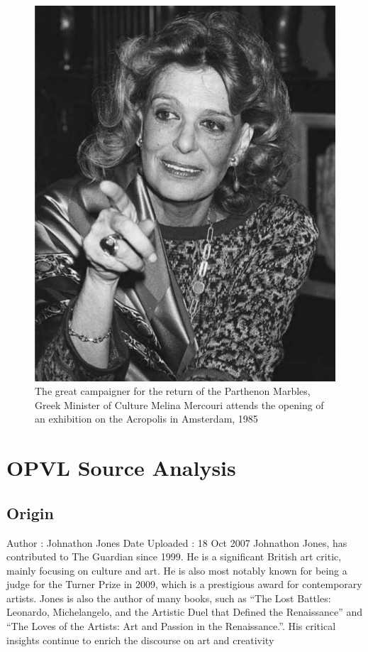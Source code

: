 \documentclass[12pt, letterpaper]{article}
\begin{document}
\begin{figure}
    \centering
    \includegraphics{Melina.png}
    \caption{The great campaigner for the return of the Parthenon Marbles, Greek Minister of Culture Melina Mercouri attends the opening of an exhibition on the Acropolis in Amsterdam, 1985}
    \label{Melina}
\end{figure}

\pagebreak
\section*{OPVL Source Analysis}
\subsection*{Origin}
Author : Johnathon Jones \newline
Date Uploaded : 18 Oct 2007 \newline
Johnathon Jones, has contributed to The Guardian since 1999. He is a significant British art critic, mainly focusing on culture and art. He is also most notably known for being a judge for the Turner Prize in 2009, which is a prestigious award for contemporary artists. Jones is also the author of many books, such as “The Lost Battles: Leonardo, Michelangelo, and the Artistic Duel that Defined the Renaissance” and “The Loves of the Artists: Art and Passion in the Renaissance.”. His critical insights continue to enrich the discourse on art and creativity
\end{document}
